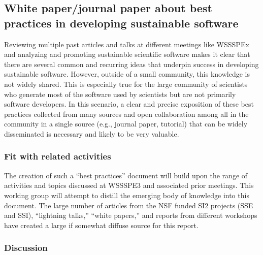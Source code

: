 \subsection{White paper/journal paper about best practices in developing sustainable software}
\label{sec:best-practices}

Reviewing multiple past articles and talks at different meetings like WSSSPEx
\cite{WSSSPE1, WSSSPE2, 5069157, Blatt_WSSSPE, Ahern_WSSSPE} and analyzing and
promoting sustainable scientific software makes it clear that there are several
common and recurring ideas that underpin success in developing sustainable
software. However, outside of a small community, this knowledge is not widely
shared. This is especially true for the large community of scientists who
generate most of the software used by scientists but are not primarily software
developers. In this scenario, a clear and precise exposition of these best
practices collected from many sources and open collaboration among all in the
community in a single source (e.g., journal paper, tutorial) that can be widely
disseminated is necessary and likely to be very valuable.

\subsubsection{Fit with related activities}

The creation of such a ``best practices'' document will build upon the range of
activities and topics discussed at WSSSPE3 and associated prior meetings. This
working group
will attempt to distill the emerging body of knowledge into this document. The
large number of articles from the NSF funded SI2 projects (SSE and SSI),
``lightning talks,'' ``white papers,'' and reports from different workshops have
created a large if somewhat diffuse source for this report.

\subsubsection{Discussion}

